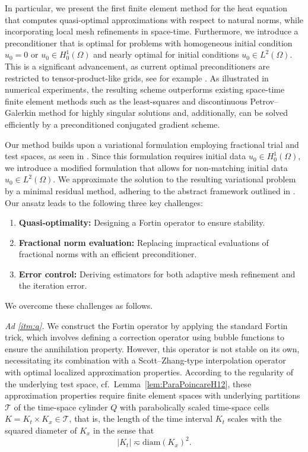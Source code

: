 \documentclass{amsart}
\providecommand{\tria}{\mathcal{T}}
\begin{document}
In particular, we present the first finite element method for the heat equation that computes quasi-optimal approximations with respect to natural norms, while incorporating local mesh refinements in space-time. Furthermore, we introduce a preconditioner that is optimal for problems with homogeneous initial condition $u_0 =0$ or $u_0 \in H^1_0(\Omega)$ and nearly optimal for initial conditions $u_0 \in L^2(\Omega)$. This is a significant advancement, as current optimal preconditioners are restricted to tensor-product-like grids, see for example \cite{Andreev16,NeumullerSmears19,StevensonWesterdiep21,VenetieWesterdiep21}. As illustrated in numerical experiments, the resulting scheme outperforms existing space-time finite element methods such as the least-squares \cite{FuehrerKarkulik21,GantnerStevenson21,GantnerStevenson23,GantnerStevenson24} and discontinuous Petrov--Galerkin \cite{DieningStorn22} method for highly singular solutions and, additionally, can be solved efficiently by a preconditioned conjugated gradient scheme.

Our method builds upon a variational formulation employing fractional trial and test spaces, as seen in \cite{SchwabStevenson17,SteinbachZank20}. 
Since this formulation requires initial data $u_0\in H^1_0(\Omega)$, we introduce a modified formulation that allows for non-matching initial data $u_0 \in L^2(\Omega)$. 
%
We approximate the solution to the resulting variational problem by a minimal residual method, adhering to the abstract framework outlined in \cite{MonsuurStevensonStorn23}.
Our ansatz leads to the following three key challenges:
\begin{enumerate}[leftmargin=25pt]
\item \textbf{Quasi-optimality:} Designing a Fortin operator to ensure stability.\label{itm:a}
\item \textbf{Fractional norm evaluation:} Replacing impractical evaluations of fractional norms with an efficient preconditioner. \label{itm:b}
\item \textbf{Error control:} Deriving estimators for both adaptive mesh refinement and the iteration error.\label{itm:c}
\end{enumerate}
\noindent 
We overcome these challenges as follows. 

\textit{Ad \ref{itm:a}.}
We construct the Fortin operator by applying the standard Fortin trick, which involves defining a correction operator using bubble functions to ensure the annihilation property. However, this operator is not stable on its own, necessitating its combination with a Scott--Zhang-type interpolation operator with optimal localized approximation properties. 
According to the regularity of the underlying test space, cf.~Lemma~\ref{lem:ParaPoincareH12}, these approximation properties require finite element spaces with underlying partitions $\tria$ of the time-space cylinder $Q$ with parabolically scaled time-space cells $K = K_t \times K_x \in \tria$, that is, the length of the time interval $K_t$ scales with the squared diameter of $K_x$ in the sense that 
\begin{equation*}
|K_t| \eqsim \text{diam}(K_x)^2.
\end{equation*} 
\end{document}

